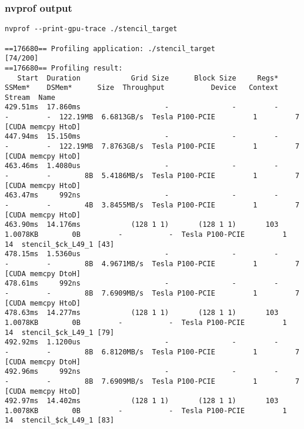 \documentclass[aspectratio=169]{beamer}
\begin{document}
\begin{frame}[fragile]
\frametitle{nvprof output}
\begin{verbatim}
nvprof --print-gpu-trace ./stencil_target

==176680== Profiling application: ./stencil_target                                                                                                                                                                                  [74/200]
==176680== Profiling result:                                                                                                                                             
   Start  Duration            Grid Size      Block Size     Regs*    SSMem*    DSMem*      Size  Throughput           Device   Context    Stream  Name              
429.51ms  17.860ms                    -               -         -         -         -  122.19MB  6.6813GB/s  Tesla P100-PCIE         1         7  [CUDA memcpy HtoD]
447.94ms  15.150ms                    -               -         -         -         -  122.19MB  7.8763GB/s  Tesla P100-PCIE         1         7  [CUDA memcpy HtoD]     
463.46ms  1.4080us                    -               -         -         -         -        8B  5.4186MB/s  Tesla P100-PCIE         1         7  [CUDA memcpy HtoD]
463.47ms     992ns                    -               -         -         -         -        4B  3.8455MB/s  Tesla P100-PCIE         1         7  [CUDA memcpy HtoD]
463.90ms  14.176ms            (128 1 1)       (128 1 1)       103  1.0078KB        0B         -           -  Tesla P100-PCIE         1        14  stencil_$ck_L49_1 [43] 
478.15ms  1.5360us                    -               -         -         -         -        8B  4.9671MB/s  Tesla P100-PCIE         1         7  [CUDA memcpy DtoH]
478.61ms     992ns                    -               -         -         -         -        8B  7.6909MB/s  Tesla P100-PCIE         1         7  [CUDA memcpy HtoD]
478.63ms  14.277ms            (128 1 1)       (128 1 1)       103  1.0078KB        0B         -           -  Tesla P100-PCIE         1        14  stencil_$ck_L49_1 [79] 
492.92ms  1.1200us                    -               -         -         -         -        8B  6.8120MB/s  Tesla P100-PCIE         1         7  [CUDA memcpy DtoH]
492.96ms     992ns                    -               -         -         -         -        8B  7.6909MB/s  Tesla P100-PCIE         1         7  [CUDA memcpy HtoD]
492.97ms  14.402ms            (128 1 1)       (128 1 1)       103  1.0078KB        0B         -           -  Tesla P100-PCIE         1        14  stencil_$ck_L49_1 [83] 

\end{verbatim}
\end{frame}
\end{document}
